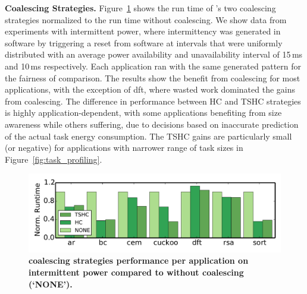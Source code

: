 \textbf{Coalescing Strategies.} Figure~\ref{fig:coalescing} shows the run time
of \sys's two coalescing strategies normalized to the run time without
coalescing. We show data from experiments with intermittent power, where intermittency was generated in software
by triggering a reset from software at intervals that were uniformly distributed with an average power availability and unavailability interval of 15\,ms and 10\,ms respectively. Each application ran with the same generated pattern for the fairness of comparison. 
%
The results show the benefit from coalescing for most applications, with the
exception of dft, where wasted work dominated the gains from coalescing.
The difference in performance between HC and TSHC strategies is highly
application-dependent, with some applications benefiting from size awareness
while others suffering, due to decisions based on inaccurate prediction of the
actual task energy consumption.
The TSHC gains are particularly small (or negative) for applications with
narrower range of task sizes in Figure~\ref{fig:task_profiling}.

\begin{figure}
	\centering
	\includegraphics[width=\columnwidth]{figures/coalStrategies}
	\caption{\textbf{\sys coalescing strategies performance per application on intermittent power compared to \sys without coalescing (`NONE').}}
	\label{fig:coalescing}
\end{figure}

